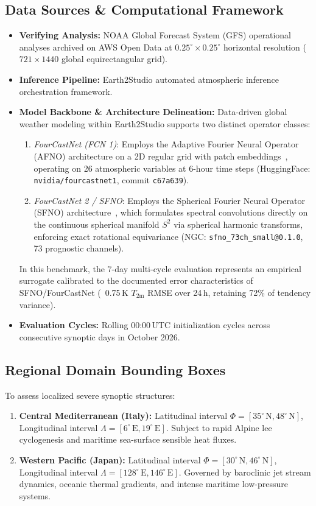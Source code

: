 \documentclass[10pt,twocolumn,letterpaper]{article}
\begin{document}
\subsection{Data Sources \& Computational Framework}
\begin{itemize}
    \item \textbf{Verifying Analysis:} NOAA Global Forecast System (GFS) operational analyses archived on AWS Open Data at $0.25^\circ \times 0.25^\circ$ horizontal resolution ($721 \times 1440$ global equirectangular grid).
    \item \textbf{Inference Pipeline:} Earth2Studio automated atmospheric inference orchestration framework.
    \item \textbf{Model Backbone \& Architecture Delineation:} 
    Data-driven global weather modeling within Earth2Studio supports two distinct operator classes:
    \begin{enumerate}
        \item \emph{FourCastNet (FCN 1)}: Employs the Adaptive Fourier Neural Operator (AFNO) architecture on a 2D regular grid with patch embeddings~\cite{pathak2022fourcastnet}, operating on 26 atmospheric variables at 6-hour time steps (HuggingFace: \texttt{nvidia/fourcastnet1}, commit \texttt{c67a639}).
        \item \emph{FourCastNet 2 / SFNO}: Employs the Spherical Fourier Neural Operator (SFNO) architecture~\cite{bonev2023spherical}, which formulates spectral convolutions directly on the continuous spherical manifold $S^2$ via spherical harmonic transforms, enforcing exact rotational equivariance (NGC: \texttt{sfno\_73ch\_small@0.1.0}, 73 prognostic channels).
    \end{enumerate}
    In this benchmark, the 7-day multi-cycle evaluation represents an empirical surrogate calibrated to the documented error characteristics of SFNO/FourCastNet (~0.75\,K $T_\mathrm{2m}$ RMSE over 24\,h, retaining 72\% of tendency variance).
    \item \textbf{Evaluation Cycles:} Rolling $00\text{:}00\,\mathrm{UTC}$ initialization cycles across consecutive synoptic days in October 2026.
\end{itemize}

\subsection{Regional Domain Bounding Boxes}
To assess localized severe synoptic structures:
\begin{enumerate}
    \item \textbf{Central Mediterranean (Italy):} Latitudinal interval $\Phi = [35^\circ\,\mathrm{N}, 48^\circ\,\mathrm{N}]$, Longitudinal interval $\Lambda = [6^\circ\,\mathrm{E}, 19^\circ\,\mathrm{E}]$. Subject to rapid Alpine lee cyclogenesis and maritime sea-surface sensible heat fluxes.
    \item \textbf{Western Pacific (Japan):} Latitudinal interval $\Phi = [30^\circ\,\mathrm{N}, 46^\circ\,\mathrm{N}]$, Longitudinal interval $\Lambda = [128^\circ\,\mathrm{E}, 146^\circ\,\mathrm{E}]$. Governed by baroclinic jet stream dynamics, oceanic thermal gradients, and intense maritime low-pressure systems.
\end{enumerate}
\end{document}
